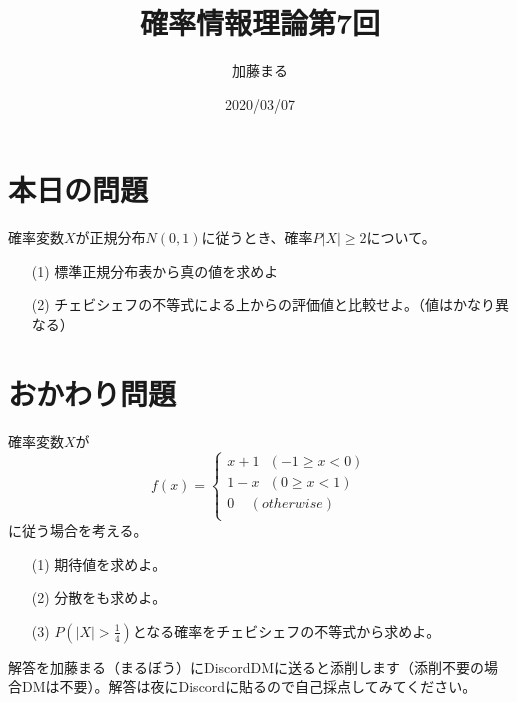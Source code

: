 \documentclass[a4j,uplatex]{jsarticle}
\title{確率情報理論第7回}
\author{加藤まる}
\date{2020/03/07}
\begin{document}
\maketitle

\section*{本日の問題}
確率変数$X$が正規分布$N(0,1)$に従うとき、確率$P{|X|\ge2}$について。
\begin{itemize}
  \item[(1)] 標準正規分布表から真の値を求めよ
  \item[(2)] チェビシェフの不等式による上からの評価値と比較せよ。（値はかなり異なる） 
\end{itemize}


\section*{おかわり問題}
確率変数$X$が
\begin{equation}
  f(x)=
 \begin{cases}
   x+1~~~(-1\ge x<0)\\
   1-x~~~(0\ge x<1)\\
   0~~~~~(otherwise)\\
 \end{cases}
\end{equation}
に従う場合を考える。
\begin{itemize}
  \item[(1)] 期待値を求めよ。
  \item[(2)] 分散をも求めよ。
  \item[(3)] $P(|X|>\frac{1}{4})$となる確率をチェビシェフの不等式から求めよ。\\
\end{itemize}
解答を加藤まる（まるぼう）にDiscordDMに送ると添削します（添削不要の場合DMは不要）。解答は夜にDiscordに貼るので自己採点してみてください。
\end{document}
